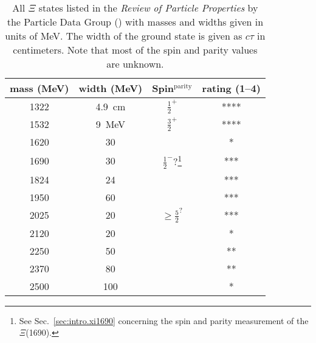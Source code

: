 \begin{table}[ht]
\begin{minipage}{\textwidth}
\renewcommand{\thefootnote}{\fnsymbol{footnote}}
\begin{center}
\begin{singlespacing}

\caption[Listed $\Xi$ States]{\label{tab:xistates}All $\Xi$ states listed in the \emph{Review of Particle Properties} by the Particle Data Group () with masses and widths given in units of MeV. The width of the ground state is given as $c\tau$ in centimeters. Note that most of the spin and parity values are unknown.}

\begin{tabular}{cccc}

\hline \hline

mass (MeV) & width (MeV) & Spin$^\mathrm{parity}$ & rating (1--4) \\

\hline

\rule{0pt}{2.7ex}1322 & 4.9~cm & $\frac{1}{2}^{+}$ & **** \\
\rule{0pt}{2.7ex}1532 & 9~MeV & $\frac{3}{2}^{+}$ & **** \\
\rule{0pt}{2.7ex}1620 & 30 &  & * \\
\rule{0pt}{2.7ex}1690 & 30 & $\frac{1}{2}^{-}$?\footnote{See Sec.~\ref{sec:intro.xi1690} concerning the spin and parity measurement of the $\Xi$(1690).} & *** \\
\rule{0pt}{2.7ex}1824 & 24 &  & *** \\
\rule{0pt}{2.7ex}1950 & 60 &  & ***  \\
\rule{0pt}{2.7ex}2025 & 20 & $\ge\frac{5}{2}^?$ & *** \\
\rule{0pt}{2.7ex}2120 & 20 &  & * \\
\rule{0pt}{2.7ex}2250 & 50 &  & ** \\
\rule{0pt}{2.7ex}2370 & 80 &  & ** \\
\rule{0pt}{2.7ex}2500 & 100 &  & * \\

\hline \hline

\end{tabular}

\end{singlespacing}
\end{center}
\end{minipage}
\end{table}
\vspace{20pt}
